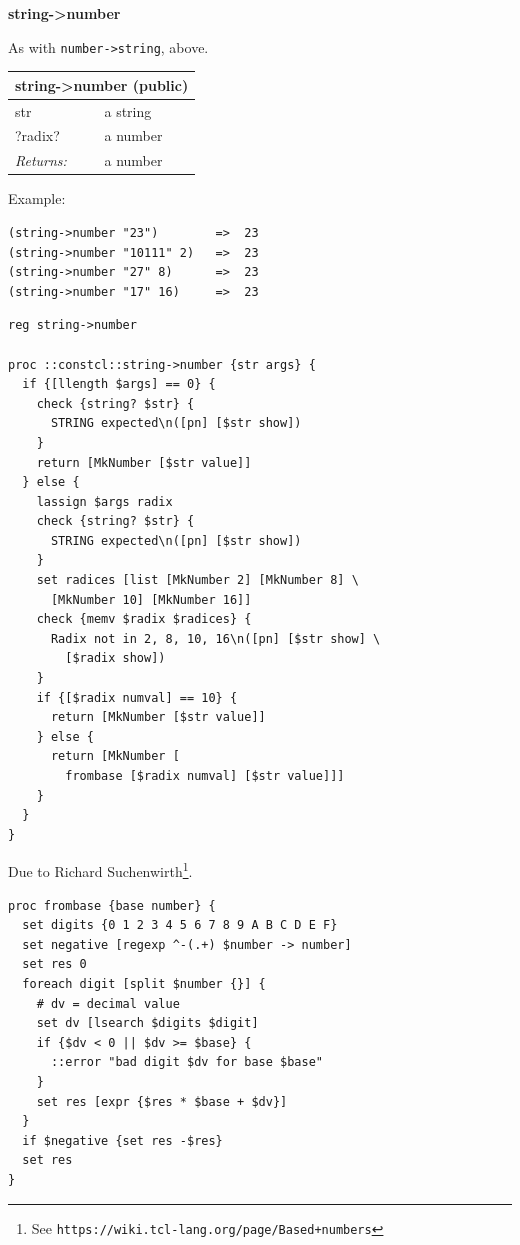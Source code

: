 \documentclass[twoside,9pt]{report}
\begin{document}
\textbf{string->number}


As with \texttt{number->string}, above.

\begin{tabular}{ |l l| }
\hline
\multicolumn{2}{|l|}{string->number (public)} \\
\hline
str & a string \\
?radix? & a number \\
\textit{Returns:} & a number \\
\hline
\end{tabular}


Example:

\noindent\makebox[\linewidth]{\rule{\linewidth}{0.4pt}}
\begin{lstlisting}
(string->number "23")        =>  23
(string->number "10111" 2)   =>  23
(string->number "27" 8)      =>  23
(string->number "17" 16)     =>  23
\end{lstlisting}
\noindent\makebox[\linewidth]{\rule{\linewidth}{0.4pt}}
\noindent\makebox[\linewidth]{\rule{\linewidth}{0.4pt}}
\begin{lstlisting}
reg string->number
 
proc ::constcl::string->number {str args} {
  if {[llength $args] == 0} {
    check {string? $str} {
      STRING expected\n([pn] [$str show])
    }
    return [MkNumber [$str value]]
  } else {
    lassign $args radix
    check {string? $str} {
      STRING expected\n([pn] [$str show])
    }
    set radices [list [MkNumber 2] [MkNumber 8] \
      [MkNumber 10] [MkNumber 16]]
    check {memv $radix $radices} {
      Radix not in 2, 8, 10, 16\n([pn] [$str show] \
        [$radix show])
    }
    if {[$radix numval] == 10} {
      return [MkNumber [$str value]]
    } else {
      return [MkNumber [
        frombase [$radix numval] [$str value]]]
    }
  }
}
\end{lstlisting}
\noindent\makebox[\linewidth]{\rule{\linewidth}{0.4pt}}

Due to Richard Suchenwirth\footnote{See \texttt{https://wiki.tcl-lang.org/page/Based+numbers}}.

\noindent\makebox[\linewidth]{\rule{\linewidth}{0.4pt}}
\begin{lstlisting}
proc frombase {base number} {
  set digits {0 1 2 3 4 5 6 7 8 9 A B C D E F}
  set negative [regexp ^-(.+) $number -> number]
  set res 0
  foreach digit [split $number {}] {
    # dv = decimal value
    set dv [lsearch $digits $digit]
    if {$dv < 0 || $dv >= $base} {
      ::error "bad digit $dv for base $base"
    }
    set res [expr {$res * $base + $dv}]
  }
  if $negative {set res -$res}
  set res
}
\end{lstlisting}
\noindent\makebox[\linewidth]{\rule{\linewidth}{0.4pt}}
\end{document}
